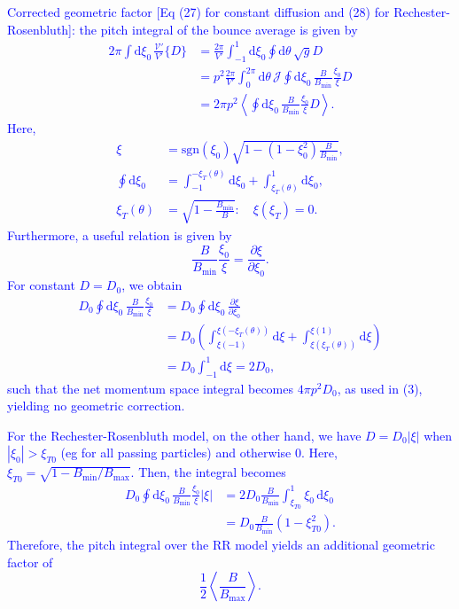 \documentclass{notes}
\begin{document}
\textcolor{blue}{
Corrected geometric factor [Eq (27) for constant diffusion and (28) for Rechester-Rosenbluth]: 
the pitch integral of the bounce average is given by
\begin{align}
2\pi \int\mathrm{d} \xi_0 \,\frac{\mathcal{V}'}{V'} \{D\} &= \frac{2\pi}{V'}\int_{-1}^1\mathrm{d} \xi_0  \oint \mathrm{d} \theta \,\sqrt{g}D\nonumber\\
&= p^2\frac{2\pi}{V'}\int_{0}^{2\pi}\mathrm{d} \theta  \, \mathcal{J} \oint \mathrm{d} \xi_0 \,\frac{B}{B_\mathrm{min}}\frac{\xi_0}{\xi}D \nonumber \\
&= 2\pi p^2 \left\langle \oint \mathrm{d} \xi_0 \,\frac{B}{B_\mathrm{min}}\frac{\xi_0}{\xi}D \right\rangle.
\end{align}
Here,
\begin{align}
\xi &= \mathrm{sgn}(\xi_0)\sqrt{1-(1-\xi_0^2)\frac{B}{B_\mathrm{min}}}, \nonumber \\
\oint \mathrm{d} \xi_0 &= \int_{-1}^{-\xi_T(\theta)} \mathrm{d}\xi_0+ \int_{\xi_T(\theta)}^1 \mathrm{d}\xi_0, \nonumber \\
\xi_T(\theta) &= \sqrt{1-\frac{B_\mathrm{min}}{B}}: \quad \xi(\xi_T) = 0.
\end{align}
Furthermore, a useful relation is given by
\begin{equation}
\frac{B}{B_\mathrm{min}}\frac{\xi_0}{\xi} = \frac{\partial \xi}{\partial \xi_0}.
\end{equation}
For constant $D = D_0$, we obtain
\begin{align}
D_0 \oint \mathrm{d} \xi_0 \,\frac{B}{B_\mathrm{min}}\frac{\xi_0}{\xi} &= D_0 \oint \mathrm{d} \xi_0 \,\frac{\partial \xi}{\partial \xi_0} \nonumber \\
&= D_0 \left( \int_{\xi(-1)}^{\xi(-\xi_T(\theta))} \mathrm{d}\xi + \int_{\xi(\xi_T(\theta))}^{\xi(1)} \mathrm{d}\xi \right) \nonumber \\
&= D_0 \int_{-1}^1 \mathrm{d}\xi = 2D_0,
\end{align}
such that the net momentum space integral becomes $4\pi p^2 D_0$, as used in (3), yielding no geometric correction.
}

\textcolor{blue}{ 
For the Rechester-Rosenbluth model, on the other hand, we have $D = D_0 |\xi|$ when $|\xi_0| > \xi_{T0}$ (eg for all passing particles) and otherwise 0. Here, $\xi_{T0} = \sqrt{1-B_\mathrm{min}/B_\mathrm{max}}$. Then, the integral becomes
\begin{align}
D_0 \oint \mathrm{d} \xi_0 \,\frac{B}{B_\mathrm{min}}\frac{\xi_0}{\xi} |\xi|  
&= 2D_0 \frac{B}{B_\mathrm{min}} \int_{\xi_{T0}}^1 \xi_0 \, \mathrm{d}\xi_0 \nonumber \\
&= D_0 \frac{B}{B_\mathrm{min}}(1-\xi_{T0}^2).
\end{align}
Therefore, the pitch integral over the RR model yields an additional geometric factor of
\begin{equation}
\frac{1}{2}\left\langle \frac{B}{B_\mathrm{max}} \right\rangle.
\end{equation}
}
\end{document}
